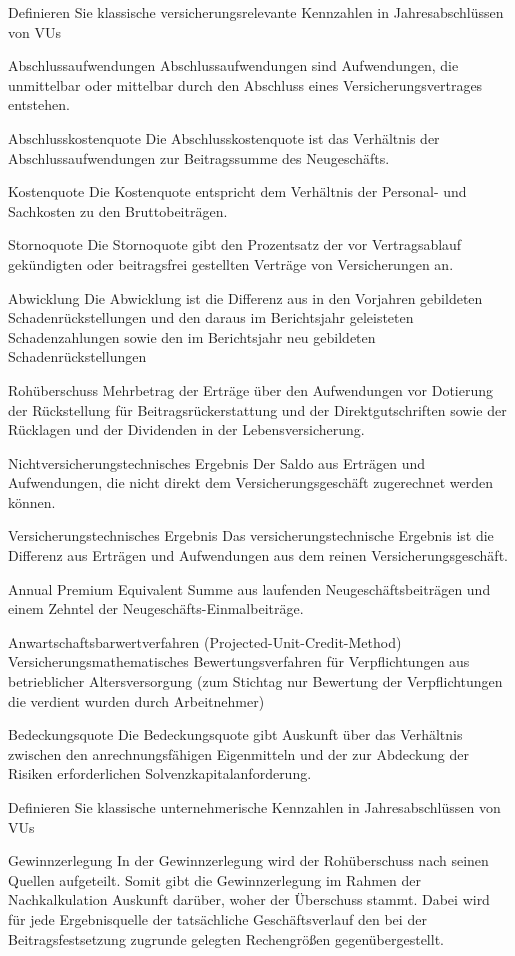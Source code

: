 Definieren Sie klassische versicherungsrelevante Kennzahlen in Jahresabschlüssen von VUs

Abschlussaufwendungen
Abschlussaufwendungen sind Aufwendungen, die unmittelbar oder mittelbar durch den Abschluss eines Versicherungsvertrages entstehen. 

Abschlusskostenquote
Die Abschlusskostenquote ist das Verhältnis der Abschlussaufwendungen zur Beitragssumme des Neugeschäfts. 

Kostenquote
Die Kostenquote entspricht dem Verhältnis der Personal- und Sachkosten zu den Bruttobeiträgen. 

Stornoquote
Die Stornoquote gibt den Prozentsatz der vor Vertragsablauf gekündigten oder beitragsfrei gestellten Verträge
von Versicherungen an.

Abwicklung
Die Abwicklung ist die Differenz aus in den Vorjahren gebildeten Schadenrückstellungen und 
den daraus im Berichtsjahr geleisteten Schadenzahlungen sowie den im Berichtsjahr neu gebildeten Schadenrückstellungen

Rohüberschuss
Mehrbetrag der Erträge über den Aufwendungen vor Dotierung der
Rückstellung für Beitragsrückerstattung und der Direktgutschriften sowie der Rücklagen und der Dividenden in der Lebensversicherung. 

Nichtversicherungstechnisches Ergebnis
Der Saldo aus Erträgen und Aufwendungen, die nicht direkt dem Versicherungsgeschäft zugerechnet werden können. 

Versicherungstechnisches Ergebnis
Das versicherungstechnische Ergebnis ist die Differenz aus Erträgen
und Aufwendungen aus dem reinen Versicherungsgeschäft. 

Annual Premium Equivalent
Summe aus laufenden Neugeschäftsbeiträgen und einem Zehntel der
Neugeschäfts-Einmalbeiträge. 

Anwartschaftsbarwertverfahren (Projected-Unit-Credit-Method)
Versicherungsmathematisches Bewertungsverfahren für Verpflichtungen aus betrieblicher Altersversorgung
(zum Stichtag nur Bewertung der Verpflichtungen die verdient wurden durch Arbeitnehmer)

Bedeckungsquote
Die Bedeckungsquote gibt Auskunft über das Verhältnis
zwischen den anrechnungsfähigen Eigenmitteln und
der zur Abdeckung der Risiken erforderlichen Solvenzkapitalanforderung.


Definieren Sie klassische unternehmerische Kennzahlen in Jahresabschlüssen von VUs

Gewinnzerlegung
In der Gewinnzerlegung wird der Rohüberschuss nach seinen Quellen
aufgeteilt. Somit gibt die Gewinnzerlegung im Rahmen der Nachkalkulation Auskunft darüber, woher der Überschuss stammt. Dabei wird für
jede Ergebnisquelle der tatsächliche Geschäftsverlauf den bei der Beitragsfestsetzung zugrunde gelegten Rechengrößen gegenübergestellt.

